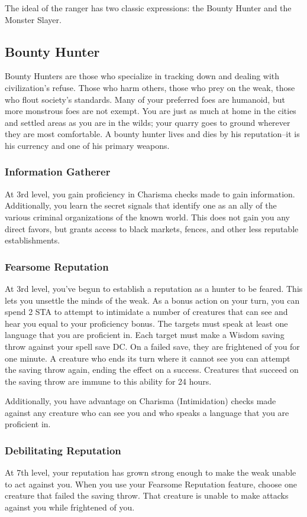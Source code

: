 The ideal of the ranger has two classic expressions: the Bounty Hunter and the Monster Slayer.

\subsection{Bounty Hunter}
Bounty Hunters are those who specialize in tracking down and dealing with civilization's refuse. Those who harm others, those who prey on the weak, those who flout society's standards. Many of your preferred foes are humanoid, but more monstrous foes are not exempt. You are just as much at home in the cities and settled areas as you are in the wilds; your quarry goes to ground wherever they are most comfortable. A bounty hunter lives and dies by his reputation--it is his currency and one of his primary weapons.

\subsubsection{Information Gatherer}
At 3rd level, you gain proficiency in Charisma checks made to gain information. Additionally, you learn the secret signals that identify one as an ally of the various criminal organizations of the known world. This does not gain you any direct favors, but grants access to black markets, fences, and other less reputable establishments.

\subsubsection{Fearsome Reputation}
At 3rd level, you've begun to establish a reputation as a hunter to be feared. This lets you unsettle the minds of the weak. As a bonus action on your turn, you can spend 2 STA to attempt to intimidate a number of creatures that can see and hear you equal to your proficiency bonus. The targets must speak at least one language that you are proficient in. Each target must make a Wisdom saving throw against your spell save DC. On a failed save, they are frightened of you for one minute. A creature who ends its turn where it cannot see you can attempt the saving throw again, ending the effect on a success. Creatures that succeed on the saving throw are immune to this ability for 24 hours.

Additionally, you have advantage on Charisma (Intimidation) checks made against any creature who can see you and who speaks a language that you are proficient in.

\subsubsection{Debilitating Reputation}
At 7th level, your reputation has grown strong enough to make the weak unable to act against you. When you use your Fearsome Reputation feature, choose one creature that failed the saving throw. That creature is unable to make attacks against you while frightened of you.

